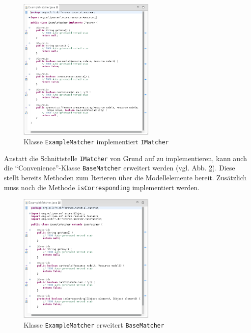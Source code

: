 \documentclass[a4paper]{scrartcl}
\begin{document}
\begin{figure}[H]
\centering
\includegraphics[width=0.6\textwidth]{graphics/silift-plugin_matcher_imatcher.png}
\caption{Klasse \texttt{ExampleMatcher} implementiert \texttt{IMatcher}}
\label{silift-plugin_matcher_imatcher}
\end{figure}

Anstatt die Schnittstelle \texttt{IMatcher} von Grund auf zu implementieren, kann auch die ``Convenience''-Klasse \texttt{BaseMatcher} erweitert werden (vgl. Abb. \ref{silift-plugin_matcher_basematcher}).
Diese stellt bereits Methoden zum Iterieren über die Modellelemente bereit.
Zusätzlich muss noch die Methode \texttt{isCorresponding} implementiert werden.

\begin{figure}[H]
\centering
\includegraphics[width=0.6\textwidth]{graphics/silift-plugin_matcher_basematcher.png}
\caption{Klasse \texttt{ExampleMatcher} erweitert \texttt{BaseMatcher}}
\label{silift-plugin_matcher_basematcher}
\end{figure}
\end{document}
